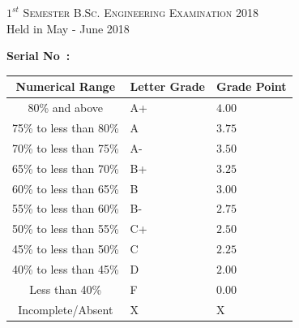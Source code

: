 \documentclass[11pt]{article}
\begin{document}
{\begin{table}[ht]
\begin{minipage}[b]{0.35\textwidth}
            \smallskip
            \textsc{$1^{st}$ Semester B.Sc. Engineering Examination 2018}\\
            {Held in May  - June 2018}\\
            \end{minipage}
            \hspace{0.2cm}
            \begin{minipage}[m]{0.3\linewidth} \flushright
            \vspace*{-1.5in}  
            {\flushright \bf	Serial No~:~\sl \\}
            \vspace{4mm}
            \begin{small}
            \renewcommand{\arraystretch}{1.01}
            \begin{tabular}{ |c|>{\centering}m{0.9cm}|m{0.91cm}|} 
                \hline {\bf Numerical Range} & {\bf Letter Grade} & {\bf Grade Point} \\
            \hline   80\% and above & A+ & $4.00$  \\ 
            \hline   75\% to less than 80\% &  A & $3.75$\\ 
            \hline   70\% to less than 75\% &  A- & $3.50$ \\ 
            \hline   65\% to less than 70\% &  B+ & $3.25$\\ 
            \hline   60\% to less than 65\% &  B  & $3.00$\\ 
            \hline   55\% to less than 60\% &  B- & $2.75$\\ 
            \hline   50\% to less than 55\% &  C+ & $2.50$\\ 
            \hline   45\% to less than 50\% &  C  & $2.25$\\
            \hline   40\% to less than 45\% &  D  & $2.00$\\
            \hline   Less than 40\%         &  F  & $0.00$\\ 
            \hline   Incomplete/Absent         &  X  & X\\ 
            \hline 
            
            \end{tabular}
            \end{small} 
            \end{minipage}
            \end{table}
            \vspace*{-0.5cm}
            \begin{center}
                \renewcommand{\arraystretch}{1.08}
                

\end{center}}
\end{document}
